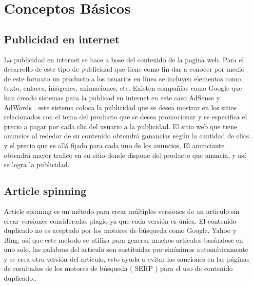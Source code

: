 
\chapter{Conceptos Básicos}

\clearpage
\section{Publicidad en internet}

La publicidad en internet se hace a base del contenido de la pagina web. Para el desarrollo de este tipo de publicidad que tiene como fin dar a conocer por medio de este formato un producto a los usuarios en línea se incluyen elementos como texto, enlaces, imágenes, animaciones, etc. Existen compañías como Google que han creado sistemas para la publicad en internet en este caso AdSense y AdWords \cite{kowaliw2012promoting}, este sistema coloca la publicidad que se desea mostrar en los sitios relacionados con el tema del producto que se desea promocionar y se especifica el precio a pagar por cada clic del usuario a la publicidad. El sitio web que tiene anuncios al rededor de su contenido obtendrá ganancias según la cantidad de clics y el precio que se allá fijado para cada uno de los anuncios, El anunciante obtendrá mayor trafico en su sitio donde dispone del producto que anuncia, y así se logra la publicidad.

\clearpage
\section{Article spinning}

Article spinning es un método para crear múltiples versiones de un articulo sin crear versiones consideradas plagio ya que cada versión es única. El contenido duplicado no es aceptado por los motores de búsqueda como Google, Yahoo y Bing, así que este método se utiliza para generar muchos artículos basándose en uno solo, las palabras del articulo son sustituidas  por sinónimos automáticamente y se crea otra versión del articulo, esto ayuda a evitar las sanciones en las páginas de resultados de los motores de búsqueda ( SERP ) para el uso de contenido duplicado.\cite{takagi2001interactive}.


